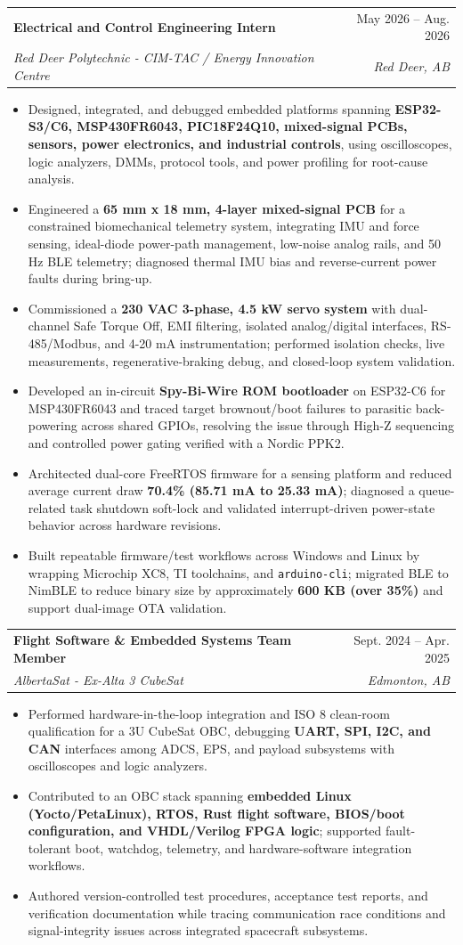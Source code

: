 \documentclass[letterpaper,11pt]{article}
\makeatletter
\newcommand{\resumeItem}[1]{
  \item\small{{#1 \vspace{-1pt}}}
}
\newcommand{\resumeSubheading}[4]{
  \vspace{-1pt}\item
    \begin{tabular*}{0.97\textwidth}[t]{l@{\extracolsep{\fill}}r}
      \textbf{#1} & #2 \\
      \textit{\small#3} & \textit{\small #4} \\
    \end{tabular*}\vspace{-6pt}
}
\newcommand{\resumeItemListStart}{\begin{itemize}[leftmargin=0.22in, itemsep=1pt, topsep=2pt]}
\newcommand{\resumeItemListEnd}{\end{itemize}\vspace{-5pt}}
\makeatother
\begin{document}
    \resumeSubheading
      {Electrical and Control Engineering Intern}{May 2026 -- Aug. 2026}
      {Red Deer Polytechnic - CIM-TAC / Energy Innovation Centre}{Red Deer, AB}
      \resumeItemListStart
        \resumeItem{Designed, integrated, and debugged embedded platforms spanning \textbf{ESP32-S3/C6, MSP430FR6043, PIC18F24Q10, mixed-signal PCBs, sensors, power electronics, and industrial controls}, using oscilloscopes, logic analyzers, DMMs, protocol tools, and power profiling for root-cause analysis.}
        \resumeItem{Engineered a \textbf{65 mm x 18 mm, 4-layer mixed-signal PCB} for a constrained biomechanical telemetry system, integrating IMU and force sensing, ideal-diode power-path management, low-noise analog rails, and 50 Hz BLE telemetry; diagnosed thermal IMU bias and reverse-current power faults during bring-up.}
        \resumeItem{Commissioned a \textbf{230 VAC 3-phase, 4.5 kW servo system} with dual-channel Safe Torque Off, EMI filtering, isolated analog/digital interfaces, RS-485/Modbus, and 4-20 mA instrumentation; performed isolation checks, live measurements, regenerative-braking debug, and closed-loop system validation.}
        \resumeItem{Developed an in-circuit \textbf{Spy-Bi-Wire ROM bootloader} on ESP32-C6 for MSP430FR6043 and traced target brownout/boot failures to parasitic back-powering across shared GPIOs, resolving the issue through High-Z sequencing and controlled power gating verified with a Nordic PPK2.}
        \resumeItem{Architected dual-core FreeRTOS firmware for a sensing platform and reduced average current draw \textbf{70.4\% (85.71 mA to 25.33 mA)}; diagnosed a queue-related task shutdown soft-lock and validated interrupt-driven power-state behavior across hardware revisions.}
        \resumeItem{Built repeatable firmware/test workflows across Windows and Linux by wrapping Microchip XC8, TI toolchains, and \texttt{arduino-cli}; migrated BLE to NimBLE to reduce binary size by approximately \textbf{600 KB (over 35\%)} and support dual-image OTA validation.}
      \resumeItemListEnd

    \resumeSubheading
      {Flight Software \& Embedded Systems Team Member}{Sept. 2024 -- Apr. 2025}
      {AlbertaSat - Ex-Alta 3 CubeSat}{Edmonton, AB}
      \resumeItemListStart
        \resumeItem{Performed hardware-in-the-loop integration and ISO 8 clean-room qualification for a 3U CubeSat OBC, debugging \textbf{UART, SPI, I2C, and CAN} interfaces among ADCS, EPS, and payload subsystems with oscilloscopes and logic analyzers.}
        \resumeItem{Contributed to an OBC stack spanning \textbf{embedded Linux (Yocto/PetaLinux), RTOS, Rust flight software, BIOS/boot configuration, and VHDL/Verilog FPGA logic}; supported fault-tolerant boot, watchdog, telemetry, and hardware-software integration workflows.}
        \resumeItem{Authored version-controlled test procedures, acceptance test reports, and verification documentation while tracing communication race conditions and signal-integrity issues across integrated spacecraft subsystems.}
      \resumeItemListEnd
\end{document}
